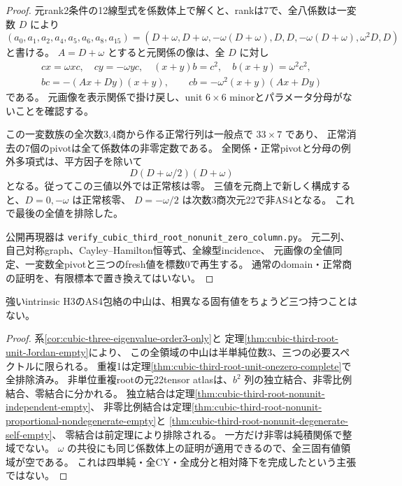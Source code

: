 \begin{proof}
元rank2条件の12線型式を係数体上で解くと、rankは7で、全八係数は一変数 $D$ により
\[
 (a_0,a_1,a_2,a_4,a_5,a_6,a_8,a_{15})
 =(D+\omega,D+\omega,-\omega(D+\omega),D,D,-\omega(D+\omega),\omega^2D,D)
\]
と書ける。
$A=D+\omega$ とすると元関係の像は、全 $D$ に対し
\begin{gather*}
 cx=\omega xc,\quad cy=-\omega yc,\quad
 (x+y)b=c^2,\quad b(x+y)=\omega^2c^2,\\
 bc=-(Ax+Dy)(x+y),\qquad
 cb=-\omega^2(x+y)(Ax+Dy)
\end{gather*}
である。
元画像を表示関係で掛け戻し、unit $6\times6$ minorとパラメータ分母がないことを確認する。

この一変数族の全次数3,4商から作る正常行列は一般点で $33\times7$ であり、
正常消去の7個のpivotは全て係数体の非零定数である。
全関係・正常pivotと分母の例外多項式は、平方因子を除いて
\[
 D(D+\omega/2)(D+\omega)
\]
となる。従ってこの三値以外では正常核は零。
三値を元商上で新しく構成すると、$D=0,-\omega$ は正常核零、
$D=-\omega/2$ は次数3商次元22で非AS4となる。
これで最後の全値を排除した。

公開再現器は \texttt{verify\_cubic\_third\_root\_nonunit\_zero\_column.py}。
元二列、自己対称graph、Cayley--Hamilton恒等式、全線型incidence、
元画像の全値同定、一変数全pivotと三つのfresh値を標数0で再生する。
通常のdomain・正常商の証明を、有限標本で置き換えてはいない。
\end{proof}

\begin{theorem}
\label{thm:cubic-three-eigenvalue-sector-empty}
強いintrinsic H3のAS4包絡の中山は、相異なる固有値をちょうど三つ持つことはない。
\end{theorem}
\begin{proof}
系\ref{cor:cubic-three-eigenvalue-order3-only}と
定理\ref{thm:cubic-third-root-unit-Jordan-empty}により、
この全領域の中山は半単純位数3、三つの必要スペクトルに限られる。
重複1は定理\ref{thm:cubic-third-root-unit-onezero-complete}で全排除済み。
非単位重複rootの元22tensor atlasは、$b^2$ 列の独立結合、非零比例結合、零結合に分かれる。
独立結合は定理\ref{thm:cubic-third-root-nonunit-independent-empty}、
非零比例結合は定理\ref{thm:cubic-third-root-nonunit-proportional-nondegenerate-empty}と
\ref{thm:cubic-third-root-nonunit-degenerate-self-empty}、
零結合は前定理により排除される。
一方だけ非零は純積関係で整域でない。
$\omega$ の共役にも同じ係数体上の証明が適用できるので、全三固有値領域が空である。
これは四単純・全CY・全成分と相対降下を完成したという主張ではない。
\end{proof}

